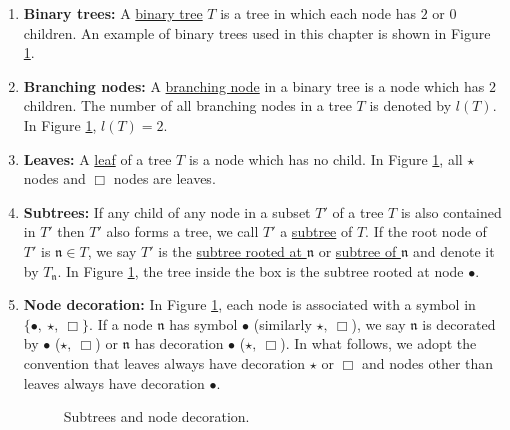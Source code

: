 \begin{defn}
\begin{enumerate}
    \item \textbf{Binary trees:} A \underline{binary tree} $T$ is a tree in which each node has $2$ or $0$ children. An example of binary trees used in this chapter is shown in Figure \ref{fig.decsub}.
    \item \textbf{Branching nodes:} A \underline{branching node} in a binary tree is a node which has $2$ children. The number of all branching nodes in a tree $T$ is denoted by $l(T)$. In Figure \ref{fig.decsub}, $l(T)=2$.
    \item \textbf{Leaves:} A \underline{leaf} of a tree $T$ is a node which has no child. In Figure \ref{fig.decsub}, all $\star$ nodes and $\Box$ nodes are leaves.
    \item \textbf{Subtrees:} If any child of any node in a subset $T'$ of a tree $T$ is also contained in $T'$ then $T' $ also forms a tree, we call $T'$ a \underline{subtree} of $T$. If the root node of $T'$ is $\mathfrak{n}\in T$, we say $T'$ is the \underline{subtree rooted at $\mathfrak{n}$} or \underline{subtree of $\mathfrak{n}$} and denote it by $T_\mathfrak{n}$. In Figure \ref{fig.decsub}, the tree inside the box is the subtree rooted at node $\bullet$.
     \item \textbf{Node decoration:} In Figure \ref{fig.decsub}, each node is associated with a symbol in $\{\bullet,\ \star,\ \Box\}$. If a node $\mathfrak{n}$ has symbol $\bullet$ (similarly $\star,\ \Box$), we say $\mathfrak{n}$ is decorated by $\bullet$ ($\star,\ \Box$) or $\mathfrak{n}$ has decoration $\bullet$ ($\star,\ \Box$). In what follows, we adopt the convention that leaves always have decoration $\star$ or $\Box$ and nodes other than leaves always have decoration $\bullet$.
     
    \begin{figure}[H]
    \centering
    \caption{Subtrees and node decoration.}
    \label{fig.decsub}
    \end{figure}


\end{enumerate}
\end{defn}
